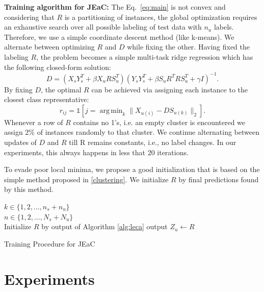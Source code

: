 \documentclass[10pt,twocolumn,letterpaper]{article}
\DeclareMathOperator*{\argmin}{arg\,min}
\begin{document}
\textbf{Training algorithm for JEaC: }
The Eq.~\eqref{eq:main} is not convex and considering that $R$ is a partitioning of instances, the global optimization requires an
exhaustive search over all possible labeling of test data with $n_u$ labels. Therefore, we use a simple coordinate descent
method (like k-means). We alternate between optimizing $R$ and $D$ while fixing the other.
Having fixed the labeling $R$, the problem becomes a simple multi-task ridge regression which has the following closed-form solution:
\begin{equation} \label{eq:d_update}
  D = (X_s Y_s^T + \beta X_u R S_u^T) (Y_s Y_s^T + \beta S_u R^T R S_u^T  + \gamma I)^{-1}.
\end{equation}
By fixing $D$, the optimal $R$ can be achieved via assigning each instance to the closest class representative:
\begin{equation} \label{eq:r_update}
  r_{ij} = \mathds{1}[j = \argmin_{k} \lVert X_{u(i)} - D S_{u(k)} \rVert_2 ].
\end{equation}
Whenever a row of $R$ contains no 1's, i.e.  an empty cluster is encountered we assign 2\% of instances randomly to that cluster.
We continue alternating between updates of $D$ and $R$ till R remains constants, i.e., no label changes. In our experiments, this always happens
in less that 20 iterations.

To evade poor local minima, we propose a good initialization that is based on the simple method proposed in \ref{clustering}. We initialize  $R$ by final predictions found by this method.

\begin{algorithm}[t]
   \label{alg:jeac}
  {\small
  $k \in \{ 1,2, \ldots, n_s + n_u \}$\\
  $n \in \{ 1,2, \ldots, N_s + N_u \}$ \\
  \BlankLine
  Initialize $R$ by output of Algorithm \ref{alg:leca} \;
  output $Z_u \leftarrow R$
 }
 \caption{Training Procedure for JEaC}
\end{algorithm}

\section{Experiments} \label{experiments}
\end{document}
